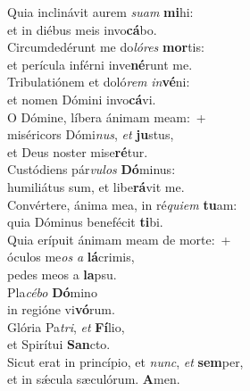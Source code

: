 \evenverse Quia inclinávit aurem \textit{su}\textit{am} \textbf{mi}hi:~\*\\
\evenverse et in diébus meis invo\textbf{cá}bo.\\
\oddverse Circumdedérunt me do\textit{ló}\textit{res} \textbf{mor}tis:~\*\\
\oddverse et perícula inférni inve\textbf{né}runt me.\\
\evenverse Tribulatiónem et doló\textit{rem} \textit{in}\textbf{vé}ni:~\*\\
\evenverse et nomen Dómini invo\textbf{cá}vi.\\
\oddverse O Dómine, líbera ánimam meam:~+\\
\oddverse  miséricors Dómi\textit{nus}, \textit{et} \textbf{ju}stus,~\*\\
\oddverse et Deus noster mise\textbf{ré}tur.\\
\evenverse Custódiens pár\textit{vu}\textit{los} \textbf{Dó}minus:~\*\\
\evenverse humiliátus sum, et libe\textbf{rá}vit me.\\
\oddverse Convértere, ánima mea, in ré\textit{qui}\textit{em} \textbf{tu}am:~\*\\
\oddverse quia Dóminus benefécit \textbf{ti}bi.\\
\evenverse Quia erípuit ánimam meam de morte:~+\\
\evenverse  óculos me\textit{os} \textit{a} \textbf{lá}crimis,~\*\\
\evenverse pedes meos a \textbf{la}psu.\\
\oddverse Pla\textit{cé}\textit{bo} \textbf{Dó}mino~\*\\
\oddverse in regióne vi\textbf{vó}rum.\\
\evenverse Glória Pa\textit{tri}, \textit{et} \textbf{Fí}lio,~\*\\
\evenverse et Spirítui \textbf{San}cto.\\
\oddverse Sicut erat in princípio, et \textit{nunc}, \textit{et} \textbf{sem}per,~\*\\
\oddverse et in sǽcula sæculórum. \textbf{A}men.\\

